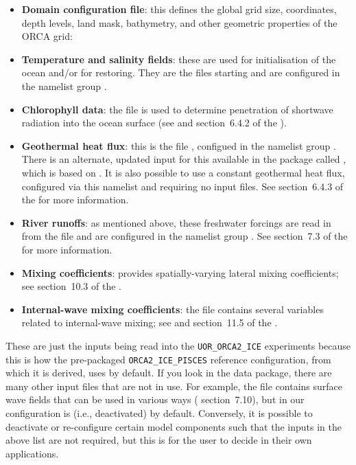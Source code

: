 \begin{itemize}
    \item \textbf{Domain configuration file}: this defines the global grid size, coordinates, depth levels, land mask, bathymetry, and other geometric properties of the ORCA grid: 
    \item \textbf{Temperature and salinity fields}: these are used for initialisation of the ocean and/or for restoring.
        They are the files starting  and are configured in the namelist group .
    \item \textbf{Chlorophyll data}: the file  is used to determine penetration of shortwave radiation into the ocean surface (see  and section~6.4.2 of the ).
    \item \textbf{Geothermal heat flux}: this is the file , configued in the namelist group .
        There is an alternate, updated input for this available in the package called , which is based on \citet{lucazeau2019analysis}.
        It is also possible to use a constant geothermal heat flux, configured via this namelist and requiring no input files.
        See section~6.4.3 of the  for more information.
    \item \textbf{River runoffs}: as mentioned above, these freshwater forcings are read in from the file  and are configured in the namelist group .
        See section~7.3 of the  for more information.
    \item \textbf{Mixing coefficients}:  provides spatially-varying lateral mixing coefficients; see section~10.3 of the .
    \item \textbf{Internal-wave mixing coefficients}: the file  contains several variables related to internal-wave mixing; see  and section~11.5 of the .
\end{itemize}

These are just the inputs being read into the \mbox{\texttt{UOR_ORCA2_ICE}} experiments because this is how the pre-packaged \mbox{\texttt{ORCA2_ICE_PISCES}} reference configuration, from which it is derived, uses by default.
If you look in the data package, there are many other input files that are not in use.
For example, the file  contains surface wave fields that can be used in various ways ( section~7.10), but in our configuration  is \nmlfalse{} (i.e., deactivated) by default.
Conversely, it is possible to deactivate or re-configure certain model components such that the inputs in the above list are not required, but this is for the user to decide in their own applications.
